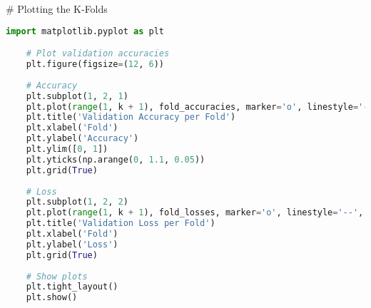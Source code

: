 # Plotting the K-Folds
\begin{lstlisting}[language=Python]
    import matplotlib.pyplot as plt

    # Plot validation accuracies
    plt.figure(figsize=(12, 6))
    
    # Accuracy
    plt.subplot(1, 2, 1)
    plt.plot(range(1, k + 1), fold_accuracies, marker='o', linestyle='--', color='b')
    plt.title('Validation Accuracy per Fold')
    plt.xlabel('Fold')
    plt.ylabel('Accuracy')
    plt.ylim([0, 1])
    plt.yticks(np.arange(0, 1.1, 0.05))
    plt.grid(True)
    
    # Loss
    plt.subplot(1, 2, 2)
    plt.plot(range(1, k + 1), fold_losses, marker='o', linestyle='--', color='r')
    plt.title('Validation Loss per Fold')
    plt.xlabel('Fold')
    plt.ylabel('Loss')
    plt.grid(True)
    
    # Show plots
    plt.tight_layout()
    plt.show()
\end{lstlisting}